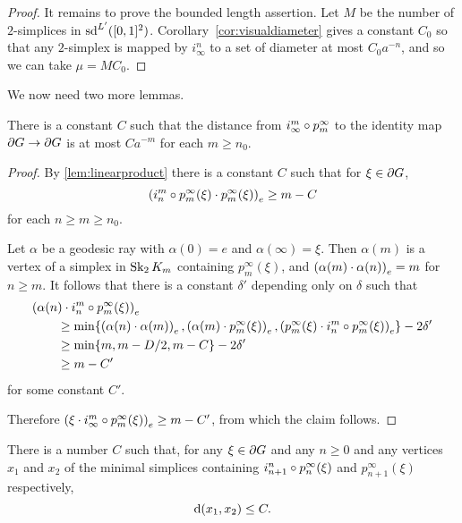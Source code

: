 \documentclass[a4paper]{article}
\begin{document}
\begin{proof}
  It remains to prove the bounded length assertion.  Let $M$ be the number of
  $2$-simplices in $\sd^{L'}([0,1]^2)$.  Corollary~\ref{cor:visualdiameter}
  gives a constant $C_0$ so that any $2$-simplex is mapped by $i^n_\infty$ to a
  set of diameter at most $C_0 a^{-n}$, and so we can take $\mu = MC_0$.
\end{proof}

We now need two more lemmas.

\begin{lemma}\label{lem:convergestoidentity}
  There is a constant $C$ such that the distance from $i^m_\infty \composed 
  p^\infty_m$ to the identity map $\boundary G\to\boundary G$ is at most 
  $Ca^{-m}$ for each $m \geq n_0$.
\end{lemma}

\begin{proof}
  By \cref{lem:linearproduct} there is a constant $C$ such that  for $\xi \in
  \boundary G$,
  \begin{equation*}
    \gromov{e}{i^m_n\composed p^\infty_m(\xi)}{p^\infty_m(\xi)} \geq m - C
  \end{equation*} 
  for each $n\geq m\geq n_0$. 

  Let $\alpha$ be a geodesic ray with $\alpha(0) = e$ and $\alpha(\infty) = 
  \xi$. Then $\alpha(m)$ is a vertex of a simplex in $\Skel_2K_m$ containing 
  $p^\infty_m(\xi)$, and $\gromov{e}{\alpha(m)}{\alpha(n)} = m$ for $n\geq m$.
  It follows that there is a constant $\delta'$ depending only on $\delta$ such 
  that
  \begin{align*}
    \mathrlap{\gromov{e}{\alpha(n)}{i^m_n\composed p^\infty_m(\xi)}}\quad\quad &\\
          & \geq \min\{\gromov{e}{\alpha(n)}{\alpha(m)}, 
            \gromov{e}{\alpha(m)}{p^\infty_m(\xi)}, 
            \gromov{e}{p^\infty_m(\xi)}{i^m_n\composed p^\infty_m(\xi)}\} 
            - 2\delta' \\
          &\geq \min\{m, m - D/2, m - C\} - 2\delta' \\
          &\geq m - C'
  \end{align*}
  for some constant $C'$.

  Therefore $\gromov{e}{\xi}{i^m_\infty\composed p^\infty_m(\xi)} \geq m - C'$, 
  from which the claim follows.
\end{proof}

\begin{lemma}\label{lem:name_this}
  There is a number $C$ such that, for any $\xi \in \boundary G$ and any $n
  \geq 0$ and any vertices $x_1$ and $x_2$ of the minimal simplices containing
  $i^n_{n+1}\composed p^\infty_n(\xi)$ and $p^\infty_{n+1}(\xi)$ respectively,
  \begin{equation*}
    \dist(x_1, x_2) \leq C.
  \end{equation*}
\end{lemma}
\end{document}

